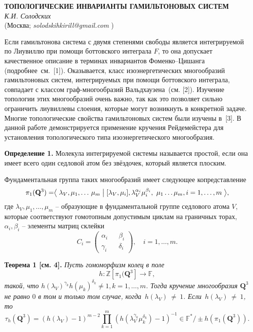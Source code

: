 \begin{center}{ \bf  ТОПОЛОГИЧЕСКИЕ ИНВАРИАНТЫ ГАМИЛЬТОНОВЫХ СИСТЕМ}\\
{\it К.И. Солодских } \\
(Москва; {\it solodskihkirill@gmail.com} )
\end{center}


Если гамильтонова система с двумя степенями свободы является интегрируемой по Лиувиллю
при помощи боттовского интеграла $F$,
то она допускает качественное описание в терминах инвариантов Фоменко--Цишанга (подробнее~см.~[1]).
Оказывается, класс изоэнергетических многообразий гамильтоновых систем,
интегрируемых при помощи боттовского интеграла,
совпадает с классом граф-многообразий Вальдхаузена~(см. [2]).
Изучение топологии этих многообразий очень важно, так как это позволяет сильно ограничить лиувиллевы слоения,
которые могут возникнуть в конкретной задаче.
Многие топологические свойства гамильтоновых систем были изучены в~[3].
В данной работе демонстрируется  применение кручения Рейдемейстера
для установления топологического типа изоэнергетического многообразия.

\textbf{Определение 1.}
Молекула интегрируемой системы называется простой,
если она имеет всего один седловой атом без звёздочек, который является плоским.

Фундаментальная группа таких многообразий имеет следующее копредставление
$$
\pi_1(\mathbf{Q}^3) = \bigm\langle \lambda_V, \mu_1, \dots\, \mu_{m} \bigm|  [\lambda_V, \mu_i], \lambda_V^{\alpha_i}\mu_i^{\beta_i} ,~ \mu_1\dots\mu_m,\\ i = 1,\dots, m \bigm\rangle,
$$
где $\lambda_V, \mu_1, \dots, \mu_m$ -- образующие в фундаментальной группе седлового атома $V$,
которые соответствуют гомотопным допустимым циклам на граничных торах,
$\alpha_i, \beta_i$ -- элементы матриц склейки
$$
C_i = \begin{pmatrix} \alpha_i && \beta_i \\ \gamma_i && \delta_i \end{pmatrix},\quad i = 1,\dots, m.
$$

\textbf{Теорема 1 [см. 4].} {\it Пусть гомоморфизм колец в поле
$$
h \colon \mathbb{Z}[\pi_1(\mathbf{Q}^3] \rightarrow \mathbb{F},
$$
такой, что $h(\lambda_V)^{\gamma_k}h(\mu_k)^{\delta_k} \ne 1, k = 1,\dots, m$.
Тогда кручение многообразия $\mathbf{Q}^3$ не равно $0$ в том и только том случае,
когда~$h(\lambda_V)~\ne~1$.
Если~$h(\lambda_V)~\ne~1$, то
$$
\tau_h(\mathbf{Q}^3) = (h(\lambda_V) - 1)^{m-2}{\underset{k=1}{\overset{m}{\prod}}(h(\lambda^{\gamma_k}_V\mu^{\delta_k}_k) - 1)^{-1}} \in \mathbb{F}^*/\pm h(\pi_1(\mathbf{Q}^3)).
$$}

